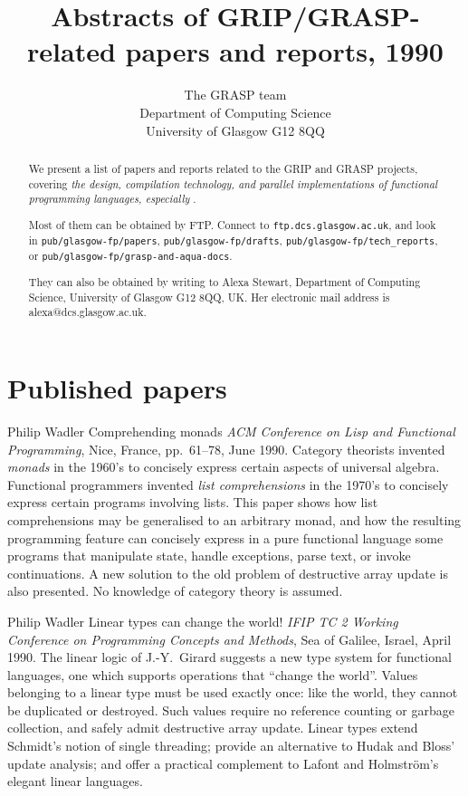 


\title{Abstracts of GRIP/GRASP-related papers and reports, 1990
}

\author{The GRASP team \\ Department of Computing Science \\
University of Glasgow G12 8QQ
}

\maketitle

\begin{abstract}
We present a list of papers and reports related to the GRIP 
and GRASP projects,
covering {\em the design, compilation technology,
and parallel implementations of functional programming languages, especially
\Haskell{}}.

Most of them can be obtained by FTP.  Connect to {\tt ftp.dcs.glasgow.ac.uk},
and look in {\tt pub/glasgow-fp/papers}, {\tt pub/glasgow-fp/drafts}, {\tt pub/glasgow-fp/tech\_reports},
or {\tt pub/glasgow-fp/grasp-and-aqua-docs}.

They can also be obtained by writing to 
Alexa Stewart, Department of Computing Science,
University of Glasgow G12 8QQ, UK.   Her electronic mail address is
alexa@dcs.glasgow.ac.uk.
\end{abstract}

\section{Published papers}

{Philip Wadler}
{Comprehending monads}
{{\em ACM Conference on Lisp and Functional Programming},
Nice, France, pp.\ 61--78, June 1990.}
{
Category theorists invented {\em monads\/} in the 1960's
to concisely express certain aspects of universal algebra.
Functional programmers invented {\em list comprehensions\/}
in the 1970's to concisely express certain programs involving lists.
This paper shows how list comprehensions may be generalised
to an arbitrary monad, and how the resulting programming feature
can concisely express in a pure functional language some
programs that manipulate state,
handle exceptions, parse text, or invoke continuations.
A new solution to the old problem
of destructive array update is also presented.
No knowledge of category theory is assumed.
}

{Philip Wadler}
{Linear types can change the world!}
{{\em IFIP TC 2 Working Conference on Programming
Concepts and Methods}, Sea of Galilee, Israel, April 1990.}
{
The linear logic of J.-Y.~Girard suggests a new type
system for functional languages, one which supports operations
that ``change the world''.
Values belonging to a linear type must be used exactly once:
like the world, they cannot be duplicated or destroyed.
Such values require no reference counting or garbage collection,
and safely admit destructive array update.
Linear types extend Schmidt's notion of single threading;
provide an alternative to Hudak and Bloss' update analysis;
and offer a practical complement to Lafont and Holmstr\"om's elegant
linear languages.
}

